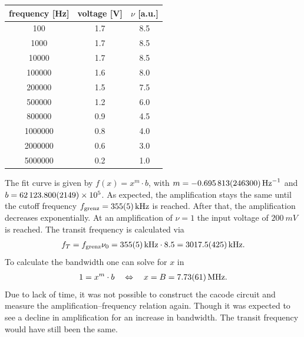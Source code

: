\documentclass[a4paper,10pt]{article}
\newenvironment{Figure}
  {\par\medskip\noindent\minipage{\linewidth}}
  {\endminipage\par\medskip} %
\numberwithin{equation}{section}
\begin{document}
\begin{multicols}{2}
\begin{Figure}
                 \label{plot:bode}
        \end{Figure}
        \begin{center}
                \begin{tabular}{|c|c|c|}
                        \hline
                        frequency [Hz] & voltage [V] & $\nu$ [a.u.]\\
                        \hline
                        100&1.7&8.5\\
                        1000&1.7&8.5\\
                        10000&1.7&8.5\\
                        100000&1.6&8.0\\
                        200000&1.5&7.5\\
                        500000&1.2&6.0\\
                        800000&0.9&4.5\\
                        1000000&0.8&4.0\\
                        2000000&0.6&3.0\\
                        5000000&0.2&1.0\\
                        \hline
                \end{tabular}
        \end{center}
        The fit curve is given by $f\left(x\right)=x^m\cdot b$, with $m=\SI{-0.695813+-0.2463}{Hz^{-1}}$ and $b=\SI{62123.8+-2.149e+05}{}$.
        As expected, the amplification stays the same until the cutoff frequency $f_\text{grenz}=\SI{355+-5}{kHz}$ is reached.
        After that, the amplification decreases exponentially.
        At an amplification of $\nu =1$ the input voltage of $\SI{200}{mV}$ is reached.
        The transit frequency is calculated via
        \begin{align} 
                f_T=f_\text{grenz}\nu _0=\SI{355+-5}{kHz}\cdot 8.5=\SI{3017.5+-42.5}{kHz}
        .\end{align} 
        To calculate the bandwidth one can solve for $x$ in
        \begin{align} 
                1=x^{m}\cdot b\quad \Leftrightarrow \quad x=B=\SI{7.73+-0.61}{MHz}
        .\end{align} 
        Due to lack of time, it was not possible to construct the cacode circuit and measure the amplification--frequency relation again.
        Though it was expected to see a decline in amplification for an increase in bandwidth.
        The transit frequency would have still been the same.


\end{multicols}
\end{document}
